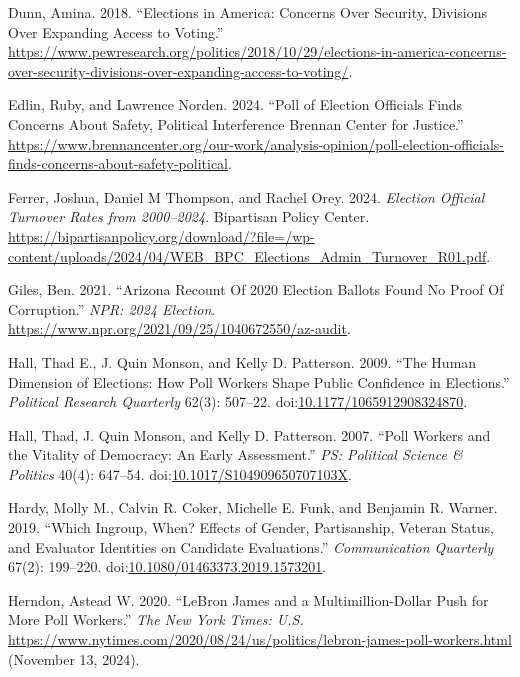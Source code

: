 \documentclass[
  11pt,
  a4paper,
]{scrartcl}
\newlength{\cslhangindent}
\newenvironment{CSLReferences}[2] %
 {\begin{list}{}{%
  \setlength{\itemindent}{0pt}
  \setlength{\leftmargin}{0pt}
  \setlength{\parsep}{0pt}
  \ifodd #1
   \setlength{\leftmargin}{\cslhangindent}
   \setlength{\itemindent}{-1\cslhangindent}
  \fi
  \setlength{\itemsep}{#2\baselineskip}}}
 {\end{list}}
\begin{document}
\begin{CSLReferences}{1}{1}
Dunn, Amina. 2018. {``Elections in {America}: {Concerns Over Security},
{Divisions Over Expanding Access} to {Voting}.''}
\url{https://www.pewresearch.org/politics/2018/10/29/elections-in-america-concerns-over-security-divisions-over-expanding-access-to-voting/}.

Edlin, Ruby, and Lawrence Norden. 2024. {``Poll of {Election Officials
Finds Concerns About Safety}, {Political Interference} \textbar{}
{Brennan Center} for {Justice}.''}
\url{https://www.brennancenter.org/our-work/analysis-opinion/poll-election-officials-finds-concerns-about-safety-political}.

Ferrer, Joshua, Daniel M Thompson, and Rachel Orey. 2024. \emph{Election
{Official Turnover Rates} from 2000--2024}. Bipartisan Policy Center.
\url{https://bipartisanpolicy.org/download/?file=/wp-content/uploads/2024/04/WEB_BPC_Elections_Admin_Turnover_R01.pdf}.

Giles, Ben. 2021. {``Arizona {Recount Of} 2020 {Election Ballots Found
No Proof Of Corruption}.''} \emph{NPR: 2024 Election}.
\url{https://www.npr.org/2021/09/25/1040672550/az-audit}.

Hall, Thad E., J. Quin Monson, and Kelly D. Patterson. 2009. {``The
{Human Dimension} of {Elections}: {How Poll Workers Shape Public
Confidence} in {Elections}.''} \emph{Political Research Quarterly}
62(3): 507--22.
doi:\href{https://doi.org/10.1177/1065912908324870}{10.1177/1065912908324870}.

Hall, Thad, J. Quin Monson, and Kelly D. Patterson. 2007. {``Poll
{Workers} and the {Vitality} of {Democracy}: {An Early Assessment}.''}
\emph{PS: Political Science \& Politics} 40(4): 647--54.
doi:\href{https://doi.org/10.1017/S104909650707103X}{10.1017/S104909650707103X}.

Hardy, Molly M., Calvin R. Coker, Michelle E. Funk, and Benjamin R.
Warner. 2019. {``Which Ingroup, When? {Effects} of Gender, Partisanship,
Veteran Status, and Evaluator Identities on Candidate Evaluations.''}
\emph{Communication Quarterly} 67(2): 199--220.
doi:\href{https://doi.org/10.1080/01463373.2019.1573201}{10.1080/01463373.2019.1573201}.

Herndon, Astead W. 2020. {``{LeBron James} and a {Multimillion-Dollar
Push} for {More Poll Workers}.''} \emph{The New York Times: U.S.}
\url{https://www.nytimes.com/2020/08/24/us/politics/lebron-james-poll-workers.html}
(November 13, 2024).


\end{CSLReferences}
\end{document}
